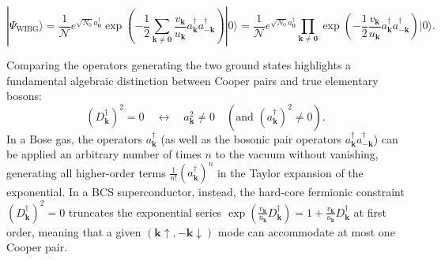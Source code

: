 \begin{enumerate}
          \[
              |\Psi_{\text{WIBG}}\rangle = \frac{1}{\mathcal{N}} e^{\sqrt{N_0} a_{\mathbf{0}}^\dagger} \exp\left( -\frac{1}{2} \sum_{\mathbf{k} \neq \mathbf{0}} \frac{v_{\mathbf{k}}}{u_{\mathbf{k}}} a_{\mathbf{k}}^\dagger a_{-\mathbf{k}}^\dagger \right) |0\rangle = \frac{1}{\mathcal{N}} e^{\sqrt{N_0} a_{\mathbf{0}}^\dagger} \prod_{\mathbf{k} \neq \mathbf{0}} \exp\left( -\frac{1}{2} \frac{v_{\mathbf{k}}}{u_{\mathbf{k}}} a_{\mathbf{k}}^\dagger a_{-\mathbf{k}}^\dagger \right) |0\rangle.
          \]
\end{enumerate}

Comparing the operators generating the two ground states highlights a fundamental algebraic distinction between Cooper pairs and true elementary bosons:
\[
    \left( D_{\mathbf{k}}^\dagger \right)^2 = 0 \quad \longleftrightarrow \quad a_{\mathbf{k}}^2 \neq 0 \quad \left( \text{and } (a_{\mathbf{k}}^\dagger)^2 \neq 0 \right).
\]
In a Bose gas, the operators \( a_{\mathbf{k}}^\dagger \) (as well as the bosonic pair operators \( a_{\mathbf{k}}^\dagger a_{-\mathbf{k}}^\dagger \)) can be applied an arbitrary number of times \( n \) to the vacuum without vanishing, generating all higher-order terms \( \frac{1}{n!} (a_{\mathbf{k}}^\dagger)^n \) in the Taylor expansion of the exponential. In a BCS superconductor, instead, the hard-core fermionic constraint \( (D_{\mathbf{k}}^\dagger)^2 = 0 \) truncates the exponential series \( \exp\left( \frac{v_{\mathbf{k}}}{u_{\mathbf{k}}} D_{\mathbf{k}}^\dagger \right) = 1 + \frac{v_{\mathbf{k}}}{u_{\mathbf{k}}} D_{\mathbf{k}}^\dagger \) at first order, meaning that a given \( (\mathbf{k}\uparrow, -\mathbf{k}\downarrow) \) mode can accommodate at most one Cooper pair.

